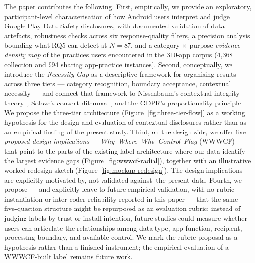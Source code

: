 \documentclass[11pt,a4paper]{article}
\begin{document}
The paper contributes the following. First, empirically, we provide
an exploratory, participant-level characterisation of how Android
users interpret and judge Google Play Data Safety disclosures, with
documented validation of data artefacts, robustness checks across
six response-quality filters, a precision analysis bounding what
RQ5 can detect at $N=87$, and a category $\times$ purpose
\emph{evidence-density map} of the practices users encountered in the
310-app corpus (4{,}368 collection and 994 sharing app-practice
instances). Second, conceptually, we introduce the \emph{Necessity
Gap} as a descriptive framework for organising results across three
tiers --- category recognition, boundary acceptance, contextual
necessity --- and connect that framework to Nissenbaum's
contextual-integrity
theory~\citep{nissenbaum:2004,nissenbaum:2010,barth:etal:2006},
Solove's consent dilemma~\citep{solove:2013}, and the GDPR's
proportionality principle~\citep{gdpr:2016}. We propose the
three-tier architecture (Figure~\ref{fig:three-tier-flow}) as a
working hypothesis for the design and evaluation of contextual
disclosures rather than as an empirical finding of the present study.
Third, on the design side, we offer five \emph{proposed design
implications} --- \emph{Why--Where--Who--Control--Flag} (WWWCF) ---
that point to the parts of the existing label architecture where our
data identify the largest evidence gaps (Figure~\ref{fig:wwwcf-radial}),
together with an illustrative worked redesign sketch
(Figure~\ref{fig:mockup-redesign}). The design implications are
explicitly motivated by, not validated against, the present data.
Fourth, we propose --- and explicitly leave to future empirical
validation, with no rubric instantiation or inter-coder reliability
reported in this paper --- that the same five-question structure
might be repurposed as an evaluation rubric:
instead of judging labels by trust or install intention, future
studies could measure whether users can articulate the relationships
among data type, app function, recipient, processing boundary, and
available control. We mark the rubric proposal as a hypothesis rather
than a finished instrument; the empirical evaluation of a WWWCF-built
label remains future work.
\end{document}
